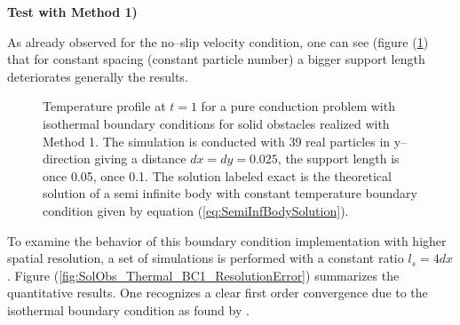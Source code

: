\documentclass[11pt,a4paper,twoside]{report}
\begin{document}
\vspace{1cm}
{\bf Test with Method 1) }
\linebreak[2]

As already observed for the no--slip velocity condition, one can see (figure (\ref{fig:SolObs_Thermal_BC1_profile}) that for constant spacing (constant particle number) a bigger support length deteriorates generally the results.


\begin{figure}[!htbp]
\centering
\label{fig:SolObs_Thermal_BC1_profile}
\caption[Temperature Profile at wall]{Temperature profile at $t=1$ for a pure conduction problem with isothermal boundary conditions for solid obstacles realized with Method 1. The simulation is conducted with 39 real particles in y--direction giving a distance $dx=dy=0.025$, the support length is once 0.05, once 0.1.
The solution labeled exact is the theoretical solution of a semi infinite body with constant temperature boundary condition given by equation (\ref{eq:SemiInfBodySolution}). }

\end{figure}

To examine the behavior of this boundary condition implementation with higher spatial resolution, a set of simulations is performed with a constant ratio $l_s=4dx$. Figure (\ref{fig:SolObs_Thermal_BC1_ResolutionError}) summarizes the quantitative results. One recognizes a clear first order convergence due to the isothermal boundary condition as found by \cite{Cleary1999}.
\end{document}
